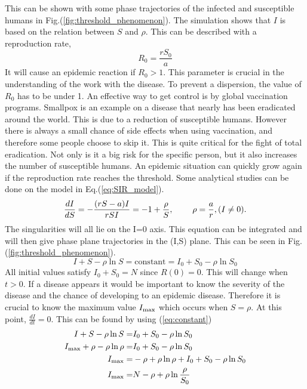 \documentclass[%
twoside,                 %
final,                   %
chapterprefix=true,      %
open=right               %
10pt]{book}
\begin{document}
This can be shown with some phase trajectories of the infected and susceptible humans in Fig.(\ref{fig:threshold_phenomenon}). The simulation shows that $I$ is based on the relation between $S$ and $\rho$. This can be described with a reproduction rate,
\begin{equation}
R_0 = \frac{rS_0}{a}
\end{equation}
It will cause an epidemic reaction if $R_0 > 1$. This parameter is crucial in the understanding of the work with the disease. To prevent a dispersion, the value of $R_0$ has to be under 1. An effective way to get control is by global vaccination programs. Smallpox is an example on a disease that nearly has been eradicated around the world. This is due to a reduction of susceptible humans. However there is always a small chance of side effects when using vaccination, and therefore some people choose to skip it. This is quite critical for the fight of total eradication. Not only is it a big risk for the specific person, but it also increases the number of susceptible humans. An epidemic situation can quickly grow again if the reproduction rate reaches the threshold. Some analytical studies can be done on the model in Eq.(\ref{eq:SIR_model}).
\begin{equation} 
\frac{dI}{dS} = -\frac{(rS-a)I}{rSI} = -1 + \frac{\rho}{S},\hspace{8mm}\rho=\frac{a}{r}, (I\neq0).
\end{equation}
The singularities will all lie on the I=0 axis. This equation can be integrated and will then give phase plane trajectories in the (I,S) plane. This can be seen in Fig.(\ref{fig:threshold_phenomenon}).
\begin{equation} \label{eq:constant}
I+S-\rho \ln S = \textrm{constant} = I_0 + S_0 - \rho \ln S_0
\end{equation}
All initial values satisfy $I_0+S_0=N$ since $R(0) = 0$. This will change when $t>0$. If a disease appears it would be important to know the severity of the disease and the chance of developing to an epidemic disease. Therefore it is crucial to know the maximum value $I_{\textrm{max}}$ which occurs when $S=\rho$. At this point, $\frac{dI}{dt}=0$. This can be found by using (\ref{eq:constant})
\begin{align} 
I+S-\rho \ln S =& I_0 + S_0 - \rho \ln S_0 \nonumber \\
I_{\textrm{max}}+\rho-\rho \ln \rho =& I_0 + S_0 - \rho \ln S_0\nonumber \\
I_{\textrm{max}}=&- \rho+\rho \ln \rho + I_0 + S_0 - \rho \ln S_0\nonumber \\
I_{\textrm{max}}=&N - \rho + \rho \ln\frac{\rho}{S_0} \label{eq:max_I}
\end{align}
\end{document}
